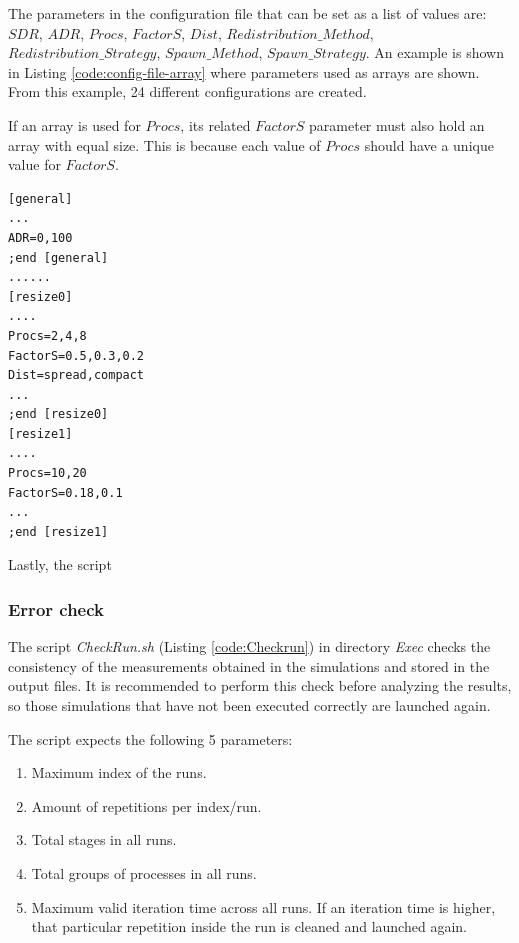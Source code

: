 The parameters in the configuration file that can be set as a list of values are: $SDR$, $ADR$, $Procs$, $FactorS$, $Dist$, $Redistribution\_Method$, $Redistribution\_Strategy$, $Spawn\_Method$, $Spawn\_Strategy$. An example is shown in Listing \ref{code:config-file-array} where parameters used as arrays are shown. From this example, 24 different configurations are created.

If an array is used for $Procs$, its related $FactorS$ parameter must also hold an array with equal size. This is because each value of $Procs$ should have a unique value for $FactorS$.

\begin{lstlisting}[float,caption=Configuration file using value list in parameters., label=code:config-file-array, captionpos=b]
[general]
...
ADR=0,100    
;end [general]
......
[resize0]
....
Procs=2,4,8    
FactorS=0.5,0.3,0.2
Dist=spread,compact 
...
;end [resize0]
[resize1]
....
Procs=10,20   
FactorS=0.18,0.1
...
;end [resize1]
\end{lstlisting}

Lastly, the script

\subsubsection{Error check}
 The script \textit{CheckRun.sh} (Listing \ref{code:Checkrun}) in directory \textit{Exec} checks the consistency of the measurements obtained in the simulations and stored in the output files. %
It is recommended to perform this check before analyzing the results, %
so those simulations that have not been executed correctly are launched again.%

The script expects the following 5 parameters:
\begin{enumerate}
  \item Maximum index of the runs.
  \item Amount of repetitions per index/run.
  \item Total stages in all runs.
  \item Total groups of processes in all runs.
  \item Maximum valid iteration time across all runs. If an iteration time is higher, that particular repetition inside the run is cleaned and launched again.
\end{enumerate}


